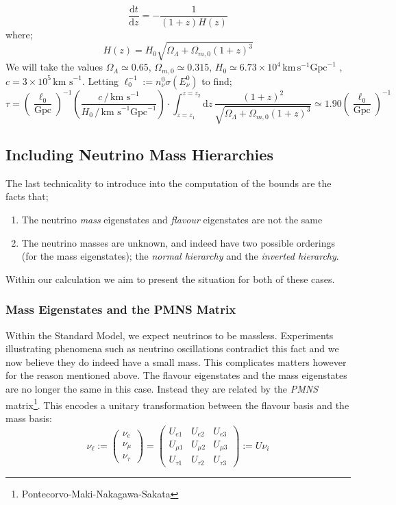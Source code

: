 \documentclass[11pt]{article}
\numberwithin{equation}{section}
\numberwithin{figure}{section}
\numberwithin{table}{section}
\newcommand{\upd}[1]{\text{d}#1 \,}
\newcommand{\ud}{\text{d}}
\newcommand{\thrbythr}[3]{\begin{pmatrix}#1 \\ #2 \\ #3\end{pmatrix}}
\begin{document}
\begin{equation}
  \frac{\ud t}{\ud z} = -\frac{1}{(1 + z)H(z)}
\end{equation}
where;
\begin{equation}
  H(z) = H_0 \sqrt{\Omega_\Lambda + \Omega_{m,0}(1 + z)^3}
\end{equation}
We will take the values $\Omega_\Lambda \simeq 0.65$, $\Omega_{m,0} \simeq 0.315$, $H_0 \simeq 6.73 \times 10^{4}\, \textrm{km}\,\textrm{s}^{-1}\textrm{Gpc}^{-1}$ \cite{Planck}, $c = 3\times 10^{5}\,\textrm{km s}^{-1}$. Letting $\ell_0^{-1} := n_\nu^0 \sigma(E_\nu^0)$ to find;
\begin{equation}
  \tau = \left(\frac{\ell_0}{\text{Gpc}}\right)^{-1} \left(\frac{c \, / \, \text{km s}^{-1}}{H_0 \, /\, \text{km s}^{-1}\text{Gpc}^{-1}}\right) \cdot \int_{z = z_1}^{z = z_2}{\upd{z}\frac{(1 + z)^2}{\sqrt{\Omega_\Lambda + \Omega_{m,0}(1 + z)^3}}} \simeq 1.90 \left(\frac{\ell_0}{\textrm{Gpc}}\right)^{-1}
\end{equation}


\subsection{Including Neutrino Mass Hierarchies}


The last technicality to introduce into the computation of the bounds are the facts that;
\begin{enumerate}
  \item The neutrino \textit{mass} eigenstates and \textit{flavour} eigenstates are not the same
  \item The neutrino masses are unknown, and indeed have two possible orderings (for the mass eigenstates); the \textit{normal hierarchy} and the \textit{inverted hierarchy}.
\end{enumerate}
Within our calculation we aim to present the situation for both of these cases.

\subsubsection{Mass Eigenstates and the PMNS Matrix}

Within the Standard Model, we expect neutrinos to be massless. Experiments illustrating phenomena such as neutrino oscillations contradict this fact and we now believe they do indeed have a small mass. This complicates matters however for the reason mentioned above. The flavour eigenstates and the mass eigenstates are no longer the same in this case. Instead they are related by the \textit{PMNS} matrix\footnote{Pontecorvo-Maki-Nakagawa-Sakata}. This encodes a unitary transformation between the flavour basis and the mass basis:
\begin{equation}
\nu_\ell := \begin{pmatrix} \nu_e \\ \nu_\mu \\ \nu_\tau \end{pmatrix} = \thrbythr{U_{e1} & U_{e2} & U_{e3}}{U_{\mu1} & U_{\mu2} & U_{\mu3}}{U_{\tau1} & U_{\tau2} & U_{\tau3}} := U \nu_i
\end{equation}
\end{document}
